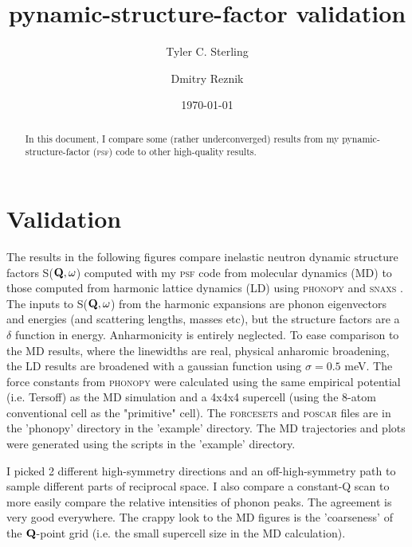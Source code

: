 \documentclass[prl,preprint,aps,superscriptaddress,floatfix]{revtex4-2}
\begin{document}
\title{pynamic-structure-factor validation}

\author{Tyler C. Sterling}

\author{Dmitry Reznik}

\date{\today}

\begin{abstract}
  In this document, I compare some (rather underconverged) results from my pynamic-structure-factor (\textsc{psf}) code to other high-quality results. 
\end{abstract}


\maketitle


\section{Validation}
  
The results in the following figures compare inelastic neutron dynamic structure factors S($\bf{Q},\omega$) computed with my \textsc{psf} code from molecular dynamics (MD) to those computed from harmonic lattice dynamics (LD) using \textsc{phonopy} \cite{phonopy} and \textsc{snaxs} \cite{parshall}. The inputs to S($\bf{Q},\omega$) from the harmonic expansions are phonon eigenvectors and energies \cite{squires} (and scattering lengths, masses etc), but the structure factors are a $\delta$ function in energy. Anharmonicity is entirely neglected. To ease comparison to the MD results, where the linewidths are real, physical anharomic broadening, the LD results are broadened with a gaussian function using $\sigma=0.5$ meV. The force constants from \textsc{phonopy} were calculated using the same empirical potential (i.e. Tersoff) as the MD simulation and a 4x4x4 supercell (using the 8-atom conventional cell as the "primitive" cell). The \textsc{forcesets} and \textsc{poscar} files are in the 'phonopy' directory in the 'example' directory. The MD trajectories and plots were generated using the scripts in the 'example' directory. 

I picked 2 different high-symmetry directions and an off-high-symmetry path to sample different parts of reciprocal space. I also compare a constant-Q scan to more easily compare the relative intensities of phonon peaks. The agreement is very good everywhere. The crappy look to the MD figures is the 'coarseness' of the $\bf{Q}$-point grid (i.e. the small supercell size in the MD calculation). 
\end{document}
